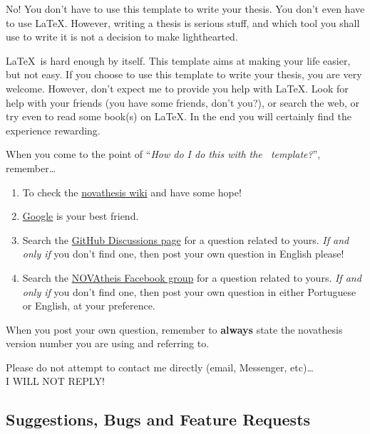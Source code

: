 \ntindex[Help]{}

No! You don't have to use this template to write your thesis.  You don't even have to use \LaTeX.  However, writing a thesis is serious stuff, and which tool you shall use to write it is not a decision to make lighthearted.

\LaTeX\ is hard enough by itself.  This template aims at making your life easier, but not easy. If you choose to use this template to write your thesis, you are very welcome.  However, don't expect me to provide you help with \LaTeX.  Look for help with your friends (you have some friends, don't you?), or search the web, or try even to read some book(s) on \LaTeX. In the end you will certainly find the experience rewarding.

When you come to the point of “\emph{How do I do this with the \novathesis\ template?}”, remember…

\begin{enumerate}
  \item To check the \href{https://github.com/joaomlourenco/novathesis/wiki}{\gls{novathesis} wiki} and have some hope!  \emojiSmile
  \item \href{https://www.google.com}{Google} is your best friend.
  \item Search the \href{https://github.com/joaomlourenco/novathesis/discussions}{GitHub Discussions page} for a question related to yours.  \emph{If and only if} you don't find one, then post your own question in English please!
  \item Search the \href{https://www.facebook.com/groups/novathesis}{NOVAtheis Facebook group} for a question related to yours.  \emph{If and only if} you don't find one, then post your own question in either Portuguese or English, at your preference.
\end{enumerate}

When you post your own question, remember to \textbf{always} state the \gls{novathesis} version number you are using and referring to.

\begin{tcolorbox}[colback=blue!8]
	\centering
Please do not attempt to contact me directly (email, Messenger, etc)…\\I WILL NOT REPLY!
\end{tcolorbox}


\subsection{Suggestions, Bugs and Feature Requests} %
\label{sub:suggestions_bugs_and_feature_requests}

